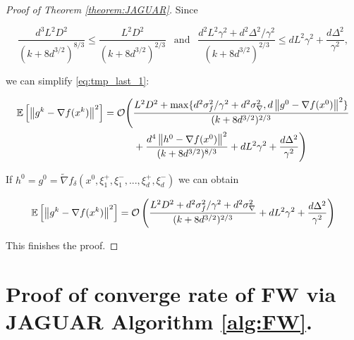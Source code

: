 \begin{proof}[Proof of Theorem \ref{theorem:JAGUAR}]
        Since 
        
        $$\frac{d^3 L^2 D^2}{(k + 8d^{3/2})^{8/3}} \leq \frac{L^2 D^2}{(k + 8d^{3/2})^{2/3}} ~~\text{ and }~~
        \frac{d^2 L^2 \gamma^2 + d^2 \Delta^2 / \gamma^2}{(k + 8d^{3/2})^{2/3}} \leq d L^2 \gamma^2 + \frac{d \Delta^2}{\gamma^2},$$

        we can simplify \eqref{eq:tmp_last_1}:

        \begin{equation*}
        \begin{split}
            \mathbb{E}\left[ \left\| g^k - \nabla f(x^k) \right\|^2 \right] 
            &=
            \mathcal{O} \Bigg(\frac{L^2 D^2 + \max\{d^2 \sigma_f^2/ \gamma^2 + d^2 \sigma_{\nabla}^2, d \left\| g^0 - \nabla f(x^0) \right\|^2\}}{(k + 8d^{3/2})^{2/3}}
            \\&\qquad\quad+
            \frac{d^4 \left\| h^0 - \nabla f(x^0) \right\|^2}{(k + 8d^{3/2})^{8/3}}
            +
            d L^2 \gamma^2 + \frac{d \Delta^2}{\gamma^2} \Bigg)
        \end{split}
        \end{equation*}

        If $h^0 = g^0 = \widetilde{\nabla} f_\delta(x^0, \xi^+_1, \xi^-_1, ..., \xi^+_d, \xi^-_d)$ we can obtain

        \begin{equation*}
            \mathbb{E}\left[ \left\| g^k - \nabla f(x^k) \right\|^2 \right] 
            =
            \mathcal{O} \left(\frac{L^2 D^2 + d^2 \sigma_f^2/ \gamma^2 + d^2 \sigma_{\nabla}^2}{(k + 8d^{3/2})^{2/3}} 
            +
            d L^2 \gamma^2 + \frac{d \Delta^2}{\gamma^2} \right)
        \end{equation*}

        This finishes the proof.
    \end{proof}


\section{Proof of converge rate of FW via JAGUAR Algorithm \ref{alg:FW}.} \label{appendix:FW}

